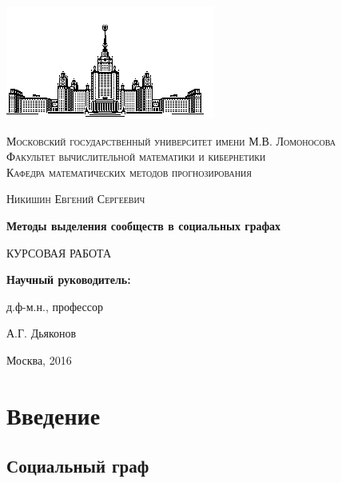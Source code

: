 \documentclass[12pt]{article}
\begin{document}
\begin{titlepage}
	\centering
	\includegraphics{pics/msu}\par\vspace{1cm}
	{\scshape Московский государственный университет имени М.В. Ломоносова \\ Факультет вычислительной математики и кибернетики \\ Кафедра математических методов прогнозирования \par}
	\vspace{2cm}
	{\scshape\large Никишин Евгений Сергеевич\par}
	\vspace{1cm}
	{\huge\bfseries Методы выделения сообществ в социальных графах\par}
	\vspace{1.5cm}
	{\scshape КУРСОВАЯ РАБОТА\par}
	\vfill

	\raggedleft
	
	{\bf Научный руководитель:}\par
	д.ф-м.н., профессор\par
	А.Г. Дьяконов
	
%	
	\vfill
	
	{\center\large Москва, 2016\par}
\end{titlepage}

\tableofcontents
\newpage

\section{Введение}

\subsection{Социальный граф}
\end{document}
